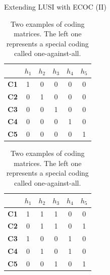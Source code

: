\documentclass[10pt, dvipsnames]{beamer}
\begin{document}
\begin{frame}{Extending LUSI with ECOC (II)}
    \begin{table}[!htb]
        \begin{minipage}{.5\textwidth}
            \centering
            \begin{tabular}{c|ccccc}
                            & $h_1$ & $h_2$ & $h_3$ & $h_4$ & $h_5$ \\ \hline
                \textbf{C1} & 1     & 0     & 0     & 0     & 0     \\
                \textbf{C2} & 0     & 1     & 0     & 0     & 0     \\
                \textbf{C3} & 0     & 0     & 1     & 0     & 0     \\
                \textbf{C4} & 0     & 0     & 0     & 1     & 0     \\
                \textbf{C5} & 0     & 0     & 0     & 0     & 1    
            \end{tabular}
        \end{minipage}%
        \begin{minipage}{.5\textwidth}
            \centering
            \begin{tabular}{c|ccccc}
                            & $h_1$ & $h_2$ & $h_3$ & $h_4$ & $h_5$ \\ \hline
                \textbf{C1} & 1     & 1     & 1     & 0     & 0     \\
                \textbf{C2} & 0     & 1     & 1     & 0     & 1     \\
                \textbf{C3} & 1     & 0     & 0     & 1     & 0     \\
                \textbf{C4} & 0     & 1     & 0     & 1     & 0     \\
                \textbf{C5} & 0     & 0     & 1     & 0     & 1    
            \end{tabular}
        \end{minipage}
        \caption{Two examples of coding matrices. The left one represents a special coding called
        one-against-all.}
    \end{table}
\end{frame}
\end{document}
